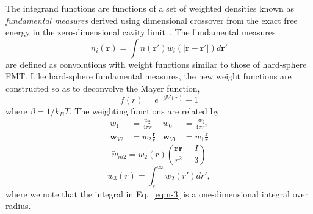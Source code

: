 \documentclass[letterpaper,twocolumn,amsmath,amssymb,prb]{revtex4-1}
\begin{document}
The integrand functions are functions of a set of weighted densities known as \emph{fundamental measures} derived using dimensional crossover from the exact free energy
in the zero-dimensional cavity limit~\cite{schmidt1999density}.
The fundamental measures
\begin{equation}
  n_{i}(\textbf{r}) = \int
  n(\textbf{r}')w_i(|\textbf{r}-\textbf{r}'|) d\textbf{r}'
  \label{eq:n-convolution}
\end{equation}
are defined as convolutions with weight functions similar to those of
hard-sphere FMT. Like hard-sphere fundamental measures, the new weight
functions are constructed so as to deconvolve the Mayer function,
\begin{equation}
  f(r) = e^{-\beta V(r)} - 1
\end{equation}
where $\beta = 1/k_BT$. %
The weighting functions are related by
\begin{align}
  w_1 &= \frac{w_2}{4\pi r} &
  w_0 &= \frac{w_2}{4\pi r^2}
  \label{eq:n-0-1}
  \\
  \mathbf{w}_{V2} &= w_2\frac{\textbf{r}}{r} &
  \mathbf{w}_{V1} &= w_1\frac{\textbf{r}}{r}
  \label{eq:n-vectors}
\end{align}
\begin{equation}
  \overleftrightarrow{w}_{m2} = w_2(r)\left(\frac{\mathbf{rr}}{r^2}-\frac{I}{3}\right)
  \label{eq:n-tensor}
\end{equation}
\begin{equation}
   w_3(r) = \int_{r}^{\infty} w_2(r') dr',
  \label{eq:n-3}
\end{equation}
where we note that the integral in Eq.~\ref{eq:n-3} is a
one-dimensional integral over radius.
\end{document}
